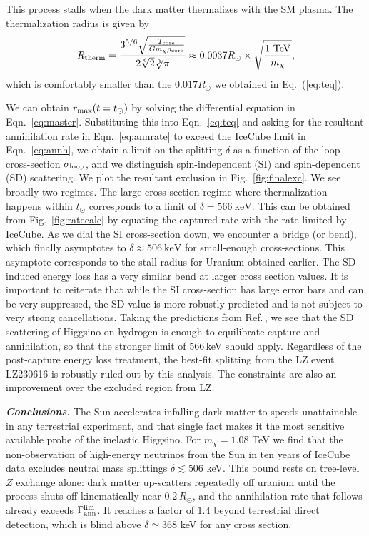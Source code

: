 \documentclass[prl,reprint,superscriptaddress]{revtex4-2}
\newcommand{\rmax}{r_{\rm max}}
\begin{document}
This process stalls when the dark matter thermalizes with the SM plasma. The thermalization radius is given by
\begin{equation}R_{\rm therm}=\frac{3^{5/6} \sqrt{\frac{T_{\rm core}}{G m_\chi \rho_{\rm core}}}}{2 \sqrt[6]{2} \sqrt[3]{\pi }}\approx 0.0037 R_\odot\times \sqrt{\frac{1\textrm{ TeV}}{m_\chi}},
\end{equation}
which is comfortably smaller than the $0.017 R_\odot$ we obtained in Eq.~(\ref{eq:teq}). 

We can obtain $\rmax(t=t_\odot)$ by solving the differential equation in Eqn.~\ref{eq:master}. Substituting this into Eqn.~\ref{eq:teq} and asking for the resultant annihilation rate in Eqn.~\ref{eq:annrate} to exceed the IceCube limit in Eqn.~\ref{eq:annh}, we obtain a limit on the splitting $\delta$ as a function of the loop cross-section $\sigma_{\rm loop}$, and we distinguish spin-independent (SI) and spin-dependent (SD) scattering. We plot the resultant exclusion in Fig.~\ref{fig:finalexc}. We see broadly two regimes. The large cross-section regime where thermalization happens within $t_\odot$ corresponds to a limit of $\delta=566~\textrm{keV}$. This can be obtained from Fig.~\ref{fig:ratecalc} by equating the captured rate with the rate limited by IceCube. As we dial the SI cross-section down, we encounter a bridge (or bend), which finally asymptotes to $\delta\approx506~\textrm{keV}$ for small-enough cross-sections. This asymptote corresponds to the stall radius for Uranium obtained earlier. The SD-induced energy loss has a very similar bend at larger cross section values. It is important to reiterate that while the SI cross-section has large error bars and can be very suppressed, the SD value is more robustly predicted and is not subject to very strong cancellations. Taking the predictions from Ref.\,\cite{Hisano:2011cs}, we see that the SD scattering of Higgsino on hydrogen is enough to equilibrate capture and annihilation, so that the stronger limit of 566\,keV should apply. 
Regardless of the post-capture energy loss treatment, the best-fit splitting from the LZ event LZ230616 is robustly ruled out by this analysis. The constraints are also an improvement over the excluded region from LZ.

 \textit{\textbf{Conclusions.}} The Sun accelerates infalling dark matter to speeds
unattainable in any terrestrial experiment, and that single fact makes it the
most sensitive available probe of the inelastic Higgsino. For
$m_\chi = 1.08$ TeV we find that the non-observation of high-energy neutrinos
from the Sun in ten years of IceCube data excludes neutral mass splittings
$\delta \lesssim 506$ keV. This bound rests on tree-level $Z$ exchange alone:
dark matter up-scatters
repeatedly off uranium until the process shuts off kinematically near
$0.2\,R_\odot$, and the annihilation rate that follows already exceeds
$\Gamma_{\rm ann}^{\rm lim}$. It reaches a factor of $1.4$ beyond terrestrial
direct detection, which is blind above $\delta \simeq 368$ keV for any cross
section.
\end{document}
